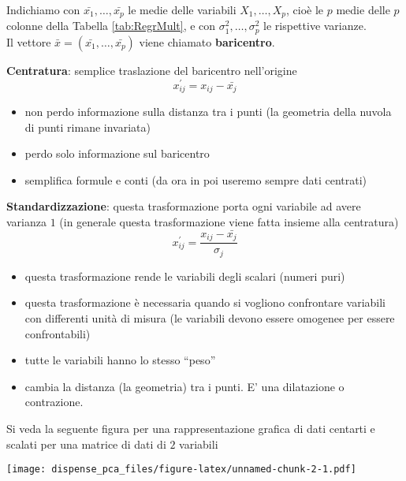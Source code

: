 \documentclass[
  11pt,
]{book}
\providecommand{\tightlist}{%
  \setlength{\itemsep}{0pt}\setlength{\parskip}{0pt}}
\begin{document}
Indichiamo con \(\bar{x_1},\dots,\bar{x_p}\) le medie delle variabili \(X_1,\dots,X_p\),
cioè le \(p\) medie delle \(p\) colonne della Tabella \ref{tab:RegrMult}, e con
\(\sigma_1^2,\dots,\sigma_p^2\) le rispettive varianze.\\
Il vettore \(\bar{x}=(\bar{x_1},\dots,\bar{x_p})\) viene chiamato \textbf{baricentro}.

\textbf{Centratura}: semplice traslazione del baricentro nell'origine
\begin{equation}
x_{ij}^{'}=x_{ij}-\bar{x_j}
\end{equation}

\begin{itemize}
\tightlist
\item
  non perdo informazione sulla distanza tra i punti (la geometria della nuvola di punti
  rimane invariata)
\item
  perdo solo informazione sul baricentro
\item
  semplifica formule e conti (da ora in poi useremo sempre dati centrati)
\end{itemize}

\textbf{Standardizzazione}: questa trasformazione porta ogni variabile ad avere varianza \(1\)
(in generale questa trasformazione viene fatta insieme alla centratura)
\begin{equation}
x_{ij}^{'}=\frac{x_{ij}-\bar{x_j}}{\sigma_j}
\end{equation}

\begin{itemize}
\tightlist
\item
  questa trasformazione rende le variabili degli scalari (numeri puri)
\item
  questa trasformazione è necessaria quando si vogliono confrontare variabili
  con differenti unità di misura (le variabili devono essere omogenee per essere confrontabili)
\item
  tutte le variabili hanno lo stesso ``peso''
\item
  cambia la distanza (la geometria) tra i punti. E' una dilatazione o contrazione.
\end{itemize}

Si veda la seguente figura per una rappresentazione grafica di dati centarti e
scalati per una matrice di dati di \(2\) variabili

\texttt{[image: dispense\_pca\_files/figure-latex/unnamed-chunk-2-1.pdf]}

  

\end{document}
